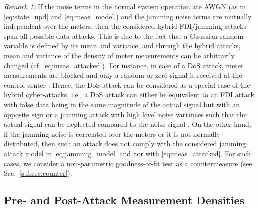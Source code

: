 \documentclass[onecolumn]{IEEEtran}
\begin{document}
\textit{Remark 1:} If the noise terms in the normal system operation are AWGN (as in \eqref{eq:state_upd} and \eqref{eq:meas_model}) and the jamming noise terms are mutually independent over the meters, then the considered hybrid FDI/jamming attacks span all possible data attacks. This is due to the fact that a Gaussian random variable is defined by its mean and variance, and through the hybrid attacks, mean and variance of the density of meter measurements can be arbitrarily changed (cf. \eqref{eq:meas_attacked}). For instance, in case of a DoS attack, meter measurements are blocked and only a random or zero signal is received at the control center \cite{Amin09,Sargolzaei17,YLi15}. Hence, the DoS attack can be considered as a special case of the hybrid cyber-attacks, i.e., a DoS attack can either be equivalent to an FDI attack with false data being in the same magnitude of the actual signal but with an opposite sign or a jamming attack with high level noise variances such that the actual signal can be neglected compared to the noise signal \cite{Necip18}. On the other hand, if the jamming noise is correlated over the meters or it is not normally distributed, then such an attack does not comply with the considered jamming attack model in \eqref{eq:jamming_model} and nor with \eqref{eq:meas_attacked}. For such cases, we consider a non-parametric goodness-of-fit test as a countermeasure (see Sec.~\ref{subsec:counter}).

\subsection{Pre- and Post-Attack Measurement Densities}
\end{document}

